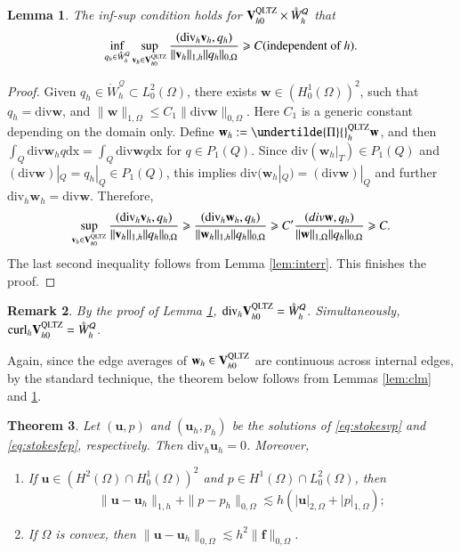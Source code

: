 \documentclass[12pt,showkeys]{amsart}
\newtheorem{theorem}{Theorem}
\newtheorem{remark}[theorem]{Remark}
\newtheorem{lemma}[theorem]{Lemma}
\begin{document}
\begin{lemma}\label{lem:discinfsup}
The inf-sup condition holds for $\mathbf{V}_{h0}^{\rm QLTZ}\times \mathring{W}_h^{\mathcal{Q}}$ that
\begin{equation}\label{eq:discinfsup}
\inf_{q_h\in \mathring{W}_h^{\mathcal{Q}}}\sup_{\mathbf{v}_h\in \mathbf{V}_{h0}^{\rm QLTZ}}\frac{(\mathrm{div}_h \mathbf{v}_h,q_h)}{\|\mathbf{v}_h\|_{1,h}\|q_h\|_{0,\Omega}}\geqslant C \mbox{(independent of $h$)}.
\end{equation}
\end{lemma}
\begin{proof}
Given $q_h\in \mathring{W}_h^{\mathcal{Q}}\subset L^2_0(\Omega)$, there exists $\mathbf{w}\in (H^1_0(\Omega))^2$, such that $q_h=\mathrm{div}\mathbf{w}$, and $\|\mathbf{w}\|_{1,\Omega}\leqslant C_1\|\mathrm{div}\mathbf{w}\|_{0,\Omega}$\cite{Girault.V;Raviart.P}. Here $C_1$ is a generic constant depending on the domain only. Define $\mathbf{w}_h:=\undertilde{\Pi}{}_h^{\rm QLTZ}\mathbf{w}$, and then $\int_Q \mathrm{div}\mathbf{w}_hq{\mathrm{dx}}=\int_Q\mathrm{div}\mathbf{w}q{\mathrm{dx}}$ for $q\in P_1(Q)$. Since $\mathrm{div}(\mathbf{w}_h|_T)\in P_1(Q)$ and $(\mathrm{div}\mathbf{w})|_Q=q_h|_Q\in P_1(Q)$, this implies $\mathrm{div}(\mathbf{w}_h|_Q)=(\mathrm{div}\mathbf{w})|_Q$ and further $\mathrm{div}_h\mathbf{w}_h=\mathrm{div}\mathbf{w}$. Therefore,
$$
\sup_{\mathbf{v}_h\in\mathbf{V}_{h0}^{\rm QLTZ}}\frac{(\mathrm{div}_h\mathbf{v}_h,q_h)}{\|\mathbf{v}_h\|_{1,h}\|q_h\|_{0,\Omega}}\geqslant \frac{(\mathrm{div}_h\mathbf{w}_h,q_h)}{\|\mathbf{w}_h\|_{1,h}\|q_h\|_{0,\Omega}}\geqslant C' \frac{(div\mathbf{w},q_h)}{\|\mathbf{w}\|_{1,\Omega}\|q_h\|_{0,\Omega}}\geqslant C.
$$
The last second inequality follows from Lemma \ref{lem:interr}. This finishes the proof.
\end{proof}
\begin{remark}\label{rem:discsur}
By the proof of Lemma \ref{lem:discinfsup}, $\mathrm{div}_h\mathbf{V}_{h0}^{\rm QLTZ}=\mathring{W}_h^{\mathcal{Q}}$. Simultaneously, $\mathrm{curl}_h\mathbf{V}_{h0}^{\rm QLTZ}=\mathring{W}_h^{\mathcal{Q}}$.
\end{remark}

Again, since the edge averages of $\mathbf{w}_h\in \mathbf{V}_{h0}^{\rm QLTZ}$ are continuous across internal edges, by the standard technique, the theorem below follows from Lemmas \ref{lem:clm} and \ref{lem:discinfsup}.

\begin{theorem}
Let $(\mathbf{u},p)$ and $(\mathbf{u}_h,p_h)$ be the solutions of \eqref{eq:stokesvp} and \eqref{eq:stokesfep}, respectively. Then $\mathrm{div}_h\mathbf{u}_h=0$. Moreover,
\begin{enumerate}
\item If $\mathbf{u}\in (H^2(\Omega)\cap H^1_0(\Omega))^2$ and $p\in H^1(\Omega)\cap L^2_0(\Omega)$, then 
$$
\|\mathbf{u}-\mathbf{u}_h\|_{1,h}+\|p-p_h\|_{0,\Omega}\lesssim h(|\mathbf{u}|_{2,\Omega}+|p|_{1,\Omega});
$$
\item If $\Omega$ is convex, then $\|\mathbf{u}-\mathbf{u}_h\|_{0,\Omega}\lesssim h^2\|\mathbf{f}\|_{0,\Omega}$.
\end{enumerate}
\end{theorem}
\end{document}
